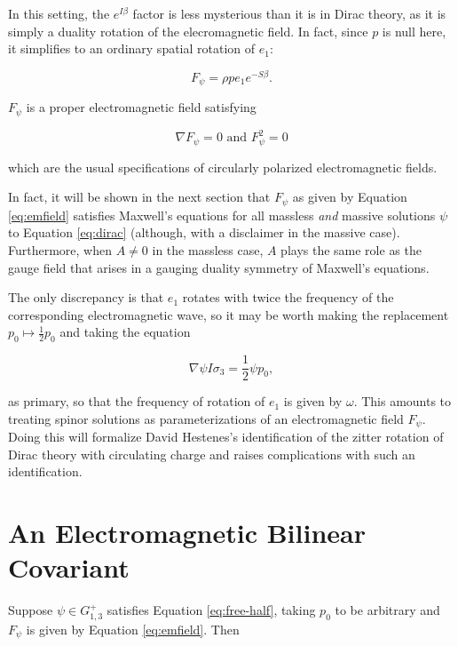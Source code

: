 \documentclass{article}
\begin{document}
    In this setting, the $e^{I \beta}$ factor is less mysterious than it is in Dirac theory, as it is simply a duality rotation of the elecromagnetic field. In fact, since $p$ is null here, it simplifies to an ordinary spatial rotation of $e_1$:

    \begin{equation}
      F_\psi = \rho p e_1 e^{-S \beta}.
    \end{equation}

    $F_\psi$ is a proper electromagnetic field satisfying

    \begin{equation}
      \nabla F_\psi = 0 \text { and } F_\psi^2 = 0
    \end{equation}

    which are the usual specifications of circularly polarized electromagnetic fields.

    In fact, it will be shown in the next section that $F_\psi$ as given by Equation \ref{eq:emfield} satisfies Maxwell's equations for all massless \emph{and} massive solutions $\psi$ to Equation \ref{eq:dirac} (although, with a disclaimer in the massive case). Furthermore, when $A \not= 0$ in the massless case, $A$ plays the same role as the gauge field that arises in a gauging duality symmetry of Maxwell's equations.

    The only discrepancy is that $e_1$ rotates with twice the frequency of the corresponding electromagnetic wave, so it may be worth making the replacement $p_0 \mapsto \frac{1}{2} p_0$ and taking the equation

    \begin{equation}
      \nabla \psi I \sigma_3 = \frac{1}{2} \psi p_0,\label{eq:free-half}
    \end{equation}

    as primary, so that the frequency of rotation of $e_1$ is given by $\omega$. This amounts to treating spinor solutions as parameterizations of an electromagnetic field $F_\psi$. Doing this will formalize David Hestenes's identification of the zitter rotation of Dirac theory with circulating charge and raises complications with such an identification.

    \section{An Electromagnetic Bilinear Covariant}\label{electromagnetism}

    Suppose $\psi \in G_{1,3}^+$ satisfies Equation \ref{eq:free-half}, taking $p_0$ to be arbitrary and $F_\psi$ is given by Equation \ref{eq:emfield}. Then
\end{document}
